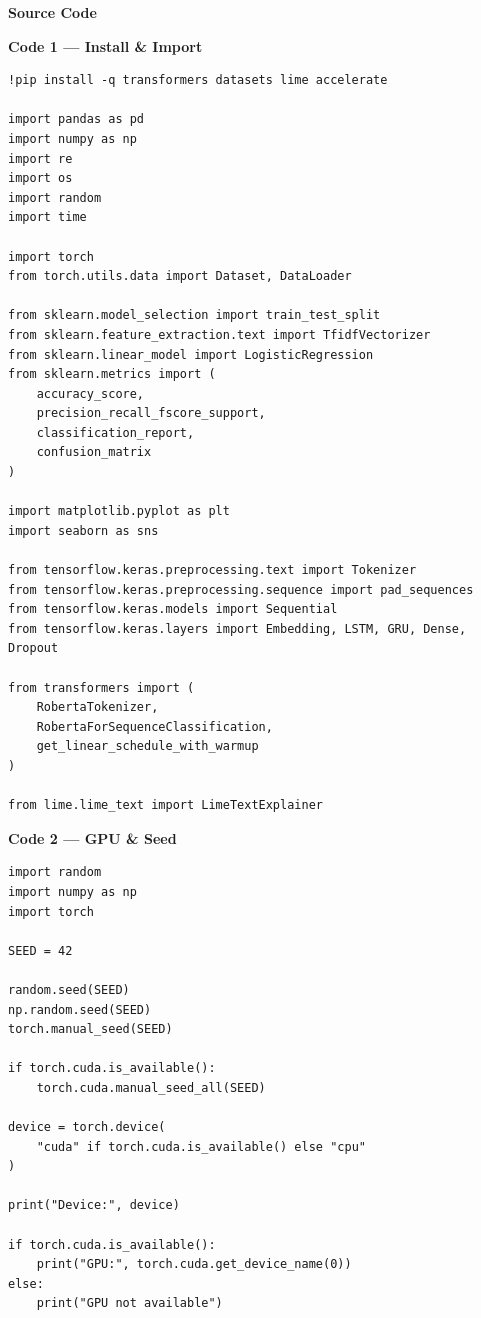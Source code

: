 \documentclass[11pt,a4paper]{article}
\begin{document}
\pagestyle{empty}
\begin{center}
{\LARGE \textbf{Source Code}}
\end{center}
\vspace{10pt}

\noindent\textbf{Code 1 --- Install \& Import}
\begin{lstlisting}
!pip install -q transformers datasets lime accelerate

import pandas as pd
import numpy as np
import re
import os
import random
import time

import torch
from torch.utils.data import Dataset, DataLoader

from sklearn.model_selection import train_test_split
from sklearn.feature_extraction.text import TfidfVectorizer
from sklearn.linear_model import LogisticRegression
from sklearn.metrics import (
    accuracy_score,
    precision_recall_fscore_support,
    classification_report,
    confusion_matrix
)

import matplotlib.pyplot as plt
import seaborn as sns

from tensorflow.keras.preprocessing.text import Tokenizer
from tensorflow.keras.preprocessing.sequence import pad_sequences
from tensorflow.keras.models import Sequential
from tensorflow.keras.layers import Embedding, LSTM, GRU, Dense, Dropout

from transformers import (
    RobertaTokenizer,
    RobertaForSequenceClassification,
    get_linear_schedule_with_warmup
)

from lime.lime_text import LimeTextExplainer
\end{lstlisting}

\noindent\textbf{Code 2 --- GPU \& Seed}
\begin{lstlisting}
import random
import numpy as np
import torch

SEED = 42

random.seed(SEED)
np.random.seed(SEED)
torch.manual_seed(SEED)

if torch.cuda.is_available():
    torch.cuda.manual_seed_all(SEED)

device = torch.device(
    "cuda" if torch.cuda.is_available() else "cpu"
)

print("Device:", device)

if torch.cuda.is_available():
    print("GPU:", torch.cuda.get_device_name(0))
else:
    print("GPU not available")
\end{lstlisting}
\end{document}
